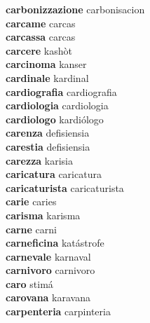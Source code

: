 \textbf{carbonizzazione } carbonisacion \\
\textbf{carcame } carcas \\
\textbf{carcassa } carcas \\
\textbf{carcere } kashòt \\
\textbf{carcinoma } kanser \\
\textbf{cardinale } kardinal \\
\textbf{cardiografia } cardiografia \\
\textbf{cardiologia } cardiologia \\
\textbf{cardiologo } kardiólogo \\
\textbf{carenza } defisiensia \\
\textbf{carestia } defisiensia \\
\textbf{carezza } karisia \\
\textbf{caricatura } caricatura \\
\textbf{caricaturista } caricaturista \\
\textbf{carie } caries \\
\textbf{carisma } karisma \\
\textbf{carne } carni \\
\textbf{carneficina } katástrofe \\
\textbf{carnevale } karnaval \\
\textbf{carnivoro } carnivoro \\
\textbf{caro } stimá \\
\textbf{carovana } karavana \\
\textbf{carpenteria } carpinteria \\
